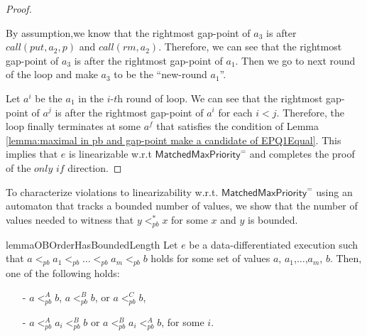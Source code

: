 \begin {proof}
\begin{itemize}
\begin{itemize}
        By assumption,we know that the rightmost gap-point of $a_3$ is after $\textit{call}(\textit{put},a_2,p)$ and $\textit{call}(\textit{rm},a_2)$. Therefore, we can see that the rightmost gap-point of $a_3$ is after the rightmost gap-point of $a_1$. Then we go to next round of the loop and make $a_3$ to be the ``new-round $a_1$''.
    \end{itemize}
\end{itemize}

Let $a^i$ be the $a_1$ in the $\textit{i-th}$ round of loop. We can see that the rightmost gap-point of $a^j$ is after the rightmost gap-point of $a^i$ for each $i<j$. Therefore, the loop finally terminates at some $a^f$ that satisfies the condition of Lemma \ref{lemma:maximal in pb and gap-point make a candidate of EPQ1Equal}. This implies that $e$ is linearizable w.r.t $\mathsf{MatchedMaxPriority}^{=}$ and completes the proof of the $\textit{only if}$ direction.
\end {proof}

To characterize violations to linearizability w.r.t. $\mathsf{MatchedMaxPriority}^{=}$ using an automaton that tracks a bounded number of values, we show that the number of values needed to witness that $y <_{\textit{pb}}^* x$ for some $x$ and $y$ is bounded.
%
%

\begin{restatable}{lemma}{OBOrderHasBoundedLength}
\label{lemma:ob order has bounded length}
Let $e$ be a data-differentiated execution such that $a <_{\textit{pb}} a_1 <_{\textit{pb}} \ldots <_{\textit{pb}} a_m <_{\textit{pb}} b$ holds for some set of values $a$, $a_1$,$\ldots$,$a_m$, $b$. Then, one of the following holds:
\begin{itemize}
\setlength{\itemsep}{0.5pt}
\item[-] $a <_{\textit{pb}}^A b$, $a <_{\textit{pb}}^B b$, or $a <_{\textit{pb}}^C b$,

\item[-] $a <_{\textit{pb}}^A a_i <_{\textit{pb}}^B b$ or $a <_{\textit{pb}}^B a_i <_{\textit{pb}}^A b$, for some $i$.
\end{itemize}
\end{restatable}


